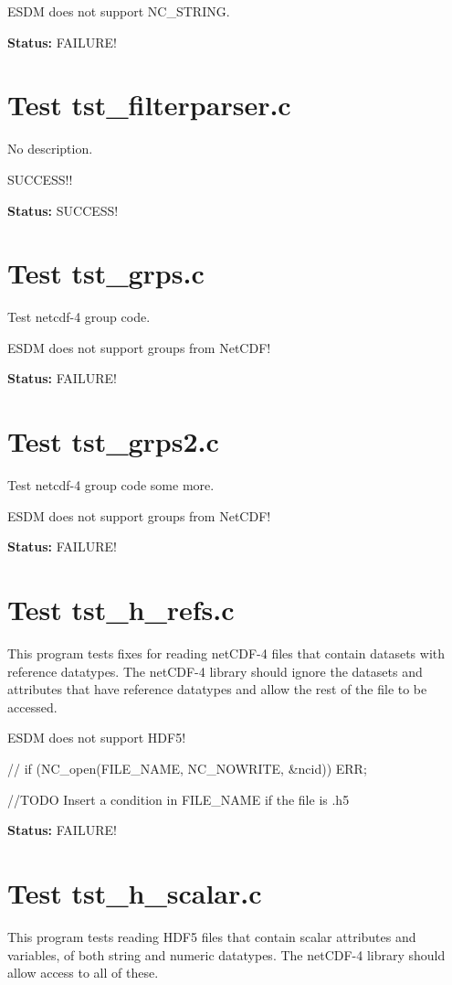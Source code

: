 ESDM does not support NC\_STRING.

{\bf \large Status: } FAILURE!

\section{Test tst\_filterparser.c}

No description.

SUCCESS!!

{\bf \large Status: } SUCCESS!

\section{Test tst\_grps.c}

Test netcdf-4 group code.

ESDM does not support groups from NetCDF!

{\bf \large Status: } FAILURE!

\section{Test tst\_grps2.c}

Test netcdf-4 group code some more.

ESDM does not support groups from NetCDF!

{\bf \large Status: } FAILURE!

\section{Test tst\_h\_refs.c}

This program tests fixes for reading netCDF-4 files that contain datasets with reference datatypes.  The netCDF-4 library should ignore the datasets and attributes that have reference datatypes and allow the rest of the file to be accessed.

ESDM does not support HDF5!

// if (NC\_open(FILE\_NAME, NC\_NOWRITE, \&ncid)) ERR;

//TODO Insert a condition in FILE\_NAME if the file is .h5

{\bf \large Status: } FAILURE!

\section{Test tst\_h\_scalar.c}

This program tests reading HDF5 files that contain scalar attributes and variables, of both string and numeric datatypes.  The netCDF-4 library should allow access to all of these.

